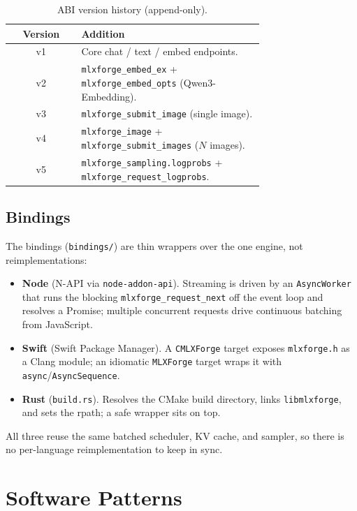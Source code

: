 \documentclass[11pt,a4paper]{report}
\newcommand{\code}[1]{\texttt{#1}}
\begin{document}
\begin{table}[h]
\centering
\caption{ABI version history (append-only).}
\label{tab:abi}
\small
\begin{tabular}{@{}c p{0.72\linewidth}@{}}
\toprule
Version & Addition \\
\midrule
v1 & Core chat / text / embed endpoints. \\
v2 & \code{mlxforge\_embed\_ex} + \code{mlxforge\_embed\_opts} (Qwen3-Embedding). \\
v3 & \code{mlxforge\_submit\_image} (single image). \\
v4 & \code{mlxforge\_image} + \code{mlxforge\_submit\_images} ($N$ images). \\
v5 & \code{mlxforge\_sampling.logprobs} + \code{mlxforge\_request\_logprobs}. \\
\bottomrule
\end{tabular}
\end{table}

\section{Bindings}
The bindings (\code{bindings/}) are thin wrappers over the one engine, not
reimplementations:
\begin{itemize}[nosep]
  \item \textbf{Node} (N-API via \code{node-addon-api}). Streaming is driven by an
        \code{AsyncWorker} that runs the blocking \code{mlxforge\_request\_next} off
        the event loop and resolves a Promise; multiple concurrent requests drive
        continuous batching from JavaScript.
  \item \textbf{Swift} (Swift Package Manager). A \code{CMLXForge} target exposes
        \code{mlxforge.h} as a Clang module; an idiomatic \code{MLXForge} target
        wraps it with \code{async}/\code{AsyncSequence}.
  \item \textbf{Rust} (\code{build.rs}). Resolves the CMake build directory, links
        \code{libmlxforge}, and sets the rpath; a safe wrapper sits on top.
\end{itemize}
All three reuse the same batched scheduler, KV cache, and sampler, so there is no
per-language reimplementation to keep in sync.

\chapter{Software Patterns}
\label{ch:patterns}
\end{document}
